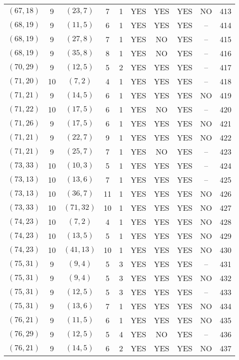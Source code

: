 \begin{longtable}{|c|c|c|c|c|c|c|c|c|c|}
$(67, 18)$ & 9 & $(23, 7)$ & 7 & 1 & YES & YES & YES & NO & 413\\
$(68, 19)$ & 9 & $(11, 5)$ & 6 & 1 & YES & YES & YES & -- & 414\\
$(68, 19)$ & 9 & $(27, 8)$ & 7 & 1 & YES & NO & YES & -- & 415\\
$(68, 19)$ & 9 & $(35, 8)$ & 8 & 1 & YES & NO & YES & -- & 416\\
$(70, 29)$ & 9 & $(12, 5)$ & 5 & 2 & YES & YES & YES & -- & 417\\
$(71, 20)$ & 10 & $(7, 2)$ & 4 & 1 & YES & YES & YES & -- & 418\\
$(71, 21)$ & 9 & $(14, 5)$ & 6 & 1 & YES & YES & YES & NO & 419\\
$(71, 22)$ & 10 & $(17, 5)$ & 6 & 1 & YES & NO & YES & -- & 420\\
$(71, 26)$ & 9 & $(17, 5)$ & 6 & 1 & YES & YES & YES & NO & 421\\
$(71, 21)$ & 9 & $(22, 7)$ & 9 & 1 & YES & YES & YES & NO & 422\\
$(71, 21)$ & 9 & $(25, 7)$ & 7 & 1 & YES & NO & YES & -- & 423\\
$(73, 33)$ & 10 & $(10, 3)$ & 5 & 1 & YES & YES & YES & -- & 424\\
$(73, 13)$ & 10 & $(13, 6)$ & 7 & 1 & YES & YES & YES & -- & 425\\
$(73, 13)$ & 10 & $(36, 7)$ & 11 & 1 & YES & YES & YES & NO & 426\\
$(73, 33)$ & 10 & $(71, 32)$ & 10 & 1 & YES & YES & YES & NO & 427\\
$(74, 23)$ & 10 & $(7, 2)$ & 4 & 1 & YES & YES & YES & NO & 428\\
$(74, 23)$ & 10 & $(13, 5)$ & 5 & 1 & YES & YES & YES & NO & 429\\
$(74, 23)$ & 10 & $(41, 13)$ & 10 & 1 & YES & YES & YES & NO & 430\\
$(75, 31)$ & 9 & $(9, 4)$ & 5 & 3 & YES & YES & YES & -- & 431\\
$(75, 31)$ & 9 & $(9, 4)$ & 5 & 3 & YES & YES & YES & NO & 432\\
$(75, 31)$ & 9 & $(12, 5)$ & 5 & 3 & YES & YES & YES & -- & 433\\
$(75, 31)$ & 9 & $(13, 6)$ & 7 & 1 & YES & YES & YES & NO & 434\\
$(76, 21)$ & 9 & $(11, 5)$ & 6 & 1 & YES & YES & YES & NO & 435\\
$(76, 29)$ & 9 & $(12, 5)$ & 5 & 4 & YES & NO & YES & -- & 436\\
$(76, 21)$ & 9 & $(14, 5)$ & 6 & 2 & YES & YES & YES & NO & 437\\

\end{longtable}
